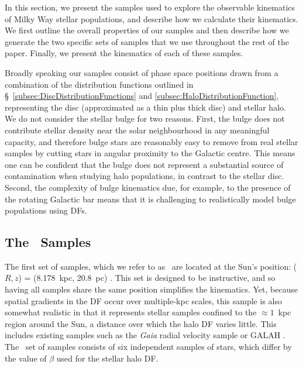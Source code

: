 In this section, we present the samples used to explore the observable kinematics of Milky Way stellar populations, and describe how we calculate their kinematics. We first outline the overall properties of our samples and then describe how we generate the two specific sets of samples that we use throughout the rest of the paper. Finally, we present the kinematics of each of these samples.

Broadly speaking our samples consist of phase space positions drawn from a combination of the distribution functions outlined in \S~\ref{subsec:DiscDistributionFunctions} and \ref{subsec:HaloDistributionFunction}, representing the disc (approximated as a thin plus thick disc) and stellar halo. We do not consider the stellar bulge for two reasons. First, the bulge does not contribute stellar density near the solar neighbourhood in any meaningful capacity, and therefore bulge stars are reasonably easy to remove from real stellar samples by cutting stars in angular proximity to the Galactic centre. This means one can be confident that the bulge does not represent a substantial source of contamination when studying halo populations, in contrast to the stellar disc. Second, the complexity of bulge kinematics due, for example, to the presence of the rotating Galactic bar means that it is challenging to realistically model bulge populations using DFs.

\subsection{The \solar\ Samples}

 The first set of samples, which we refer to as \solar\ are located at the Sun's position: ($R,z$) = (8.178~kpc, 20.8~pc) \citep{gravity19,bennett19}. This set is designed to be instructive, and so having all samples share the same position simplifies the kinematics. Yet, because spatial gradients in the DF occur over multiple-kpc scales, this sample is also somewhat realistic in that it represents stellar samples confined to the $\approx 1$~kpc region around the Sun, a distance over which the halo DF varies little. This includes existing samples such as the \textit{Gaia} radial velocity sample \citep[see section~3.3 in  ][ for the most recent data]{gaiaedr3} or GALAH \citep{galah,galahdr3}. The \solar\ set of samples consists of six independent samples of stars, which differ by the value of $\beta$ used for the stellar halo DF.

